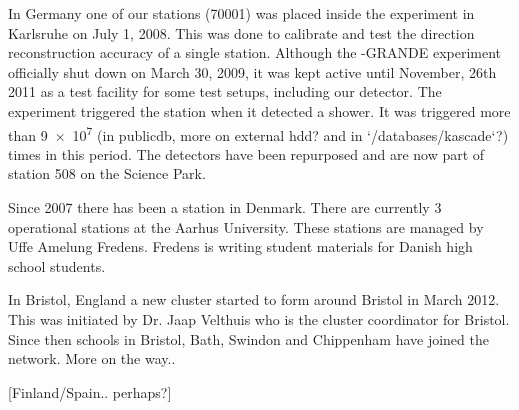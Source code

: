 In Germany one of our stations (70001) was placed inside the \kascade
experiment in Karlsruhe on July 1, 2008. This was done to calibrate and
test the direction reconstruction accuracy of a single \hisparc station.
Although the \kascade-GRANDE \cite{kascade:grande} experiment officially
shut down on March 30, 2009, it was kept active until November, 26th
2011 as a test facility for some test setups, including our detector.
The \kascade experiment \cite{kascade:experiment} triggered the \hisparc
station when it detected a shower. It was triggered more than \num{9e7}
(in publicdb, more on external hdd? and in `/databases/kascade`?) times
in this period. The detectors have been repurposed and are now part of
station 508 on the Science Park.

Since 2007 there has been a \hisparc station in
Denmark. There are currently 3 operational stations at the Aarhus
University. These stations are managed by Uffe Amelung Fredens.
Fredens is writing student materials for Danish high school students.

In Bristol, England a new cluster started to form around Bristol in
March 2012. This was initiated by Dr. Jaap Velthuis who is the cluster
coordinator for Bristol. Since then schools in Bristol, Bath, Swindon
and Chippenham have joined the network. More on the way..

[Finland/Spain.. perhaps?]
